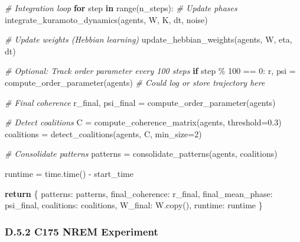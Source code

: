 \documentclass[
]{article}
\newenvironment{Shaded}{}{}
\newcommand{\BuiltInTok}[1]{\textcolor[rgb]{0.00,0.50,0.00}{#1}}
\newcommand{\CommentTok}[1]{\textcolor[rgb]{0.38,0.63,0.69}{\textit{#1}}}
\newcommand{\ControlFlowTok}[1]{\textcolor[rgb]{0.00,0.44,0.13}{\textbf{#1}}}
\newcommand{\DecValTok}[1]{\textcolor[rgb]{0.25,0.63,0.44}{#1}}
\newcommand{\FloatTok}[1]{\textcolor[rgb]{0.25,0.63,0.44}{#1}}
\newcommand{\KeywordTok}[1]{\textcolor[rgb]{0.00,0.44,0.13}{\textbf{#1}}}
\newcommand{\NormalTok}[1]{#1}
\newcommand{\OperatorTok}[1]{\textcolor[rgb]{0.40,0.40,0.40}{#1}}
\newcommand{\StringTok}[1]{\textcolor[rgb]{0.25,0.44,0.63}{#1}}
\begin{document}
\begin{Shaded}
\begin{Highlighting}[]
    \CommentTok{\# Integration loop}
    \ControlFlowTok{for}\NormalTok{ step }\KeywordTok{in} \BuiltInTok{range}\NormalTok{(n\_steps):}
        \CommentTok{\# Update phases}
\NormalTok{        integrate\_kuramoto\_dynamics(agents, W, K, dt, noise)}

        \CommentTok{\# Update weights (Hebbian learning)}
\NormalTok{        update\_hebbian\_weights(agents, W, eta, dt)}

        \CommentTok{\# Optional: Track order parameter every 100 steps}
        \ControlFlowTok{if}\NormalTok{ step }\OperatorTok{\%} \DecValTok{100} \OperatorTok{==} \DecValTok{0}\NormalTok{:}
\NormalTok{            r, psi }\OperatorTok{=}\NormalTok{ compute\_order\_parameter(agents)}
            \CommentTok{\# Could log or store trajectory here}

    \CommentTok{\# Final coherence}
\NormalTok{    r\_final, psi\_final }\OperatorTok{=}\NormalTok{ compute\_order\_parameter(agents)}

    \CommentTok{\# Detect coalitions}
\NormalTok{    C }\OperatorTok{=}\NormalTok{ compute\_coherence\_matrix(agents, threshold}\OperatorTok{=}\FloatTok{0.3}\NormalTok{)}
\NormalTok{    coalitions }\OperatorTok{=}\NormalTok{ detect\_coalitions(agents, C, min\_size}\OperatorTok{=}\DecValTok{2}\NormalTok{)}

    \CommentTok{\# Consolidate patterns}
\NormalTok{    patterns }\OperatorTok{=}\NormalTok{ consolidate\_patterns(agents, coalitions)}

\NormalTok{    runtime }\OperatorTok{=}\NormalTok{ time.time() }\OperatorTok{{-}}\NormalTok{ start\_time}

    \ControlFlowTok{return}\NormalTok{ \{}
        \StringTok{\textquotesingle{}patterns\textquotesingle{}}\NormalTok{: patterns,}
        \StringTok{\textquotesingle{}final\_coherence\textquotesingle{}}\NormalTok{: r\_final,}
        \StringTok{\textquotesingle{}final\_mean\_phase\textquotesingle{}}\NormalTok{: psi\_final,}
        \StringTok{\textquotesingle{}coalitions\textquotesingle{}}\NormalTok{: coalitions,}
        \StringTok{\textquotesingle{}W\_final\textquotesingle{}}\NormalTok{: W.copy(),}
        \StringTok{\textquotesingle{}runtime\textquotesingle{}}\NormalTok{: runtime}
\NormalTok{    \}}
\end{Highlighting}
\end{Shaded}

\subsubsection{D.5.2 C175 NREM
Experiment}\label{d.5.2-c175-nrem-experiment}
\end{document}
